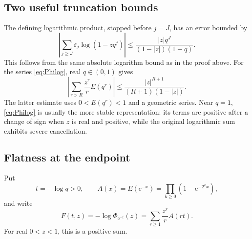 \documentclass[11pt,oneside]{article}
\numberwithin{equation}{section}
\theoremstyle{definition}
\theoremstyle{remark}
\newcommand{\eps}{\varepsilon}
\newcommand{\e}{\mathrm e}
\begin{document}
\subsection{Two useful truncation bounds}
The defining logarithmic product, stopped before \(j=J\), has an error bounded
by
\begin{equation}
 \left|\sum_{j\ge J}\eps_j\log(1-zq^j)\right|
 \le\frac{|z|q^J}{(1-|z|)(1-q)}.
 \label{eq:jtail}
\end{equation}
This follows from the same absolute logarithm bound as in the proof above.
For the series \eqref{eq:Philog}, real \(q\in(0,1)\) gives
\begin{equation}
 \left|\sum_{r>R}\frac{z^r}{r}E(q^r)\right|
 \le\frac{|z|^{R+1}}{(R+1)(1-|z|)}.
 \label{eq:rtail}
\end{equation}
The latter estimate uses \(0<E(q^r)<1\) and a geometric series. Near \(q=1\),
\eqref{eq:Philog} is usually the more stable representation: its terms are
positive after a change of sign when \(z\) is real and positive, while the
original logarithmic sum exhibits severe cancellation.

\subsection{Flatness at the endpoint}
Put
\begin{equation}
 t=-\log q>0,\qquad
 A(x)=E(\e^{-x})=\prod_{k\ge0}(1-\e^{-2^kx}),
 \label{eq:A}
\end{equation}
and write
\begin{equation}
 F(t,z)=-\log\Phi_{\e^{-t}}(z)
       =\sum_{r\ge1}\frac{z^r}{r}A(rt).
 \label{eq:F}
\end{equation}
For real \(0<z<1\), this is a positive sum.
\end{document}
